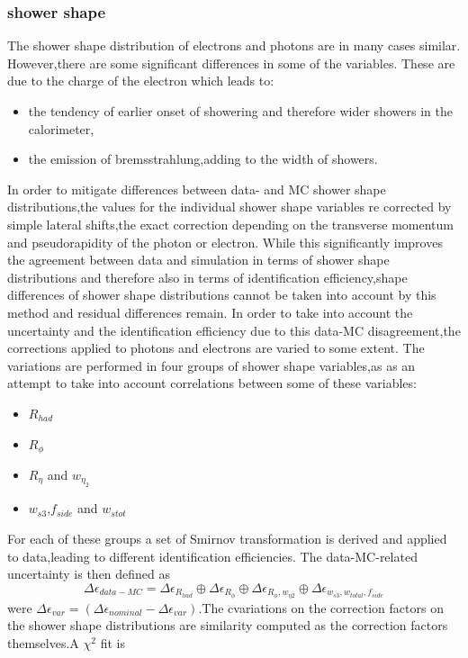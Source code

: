 \documentclass{ctexart}
\begin{document}
\subsubsection{shower shape}
The shower shape distribution of electrons and photons are in many cases similar. However,there are some significant differences in some of the variables. These are due to the charge of the electron which leads to:
\begin{itemize}
    \item the tendency of earlier onset of showering and therefore wider showers in the calorimeter,
    \item the emission of bremsstrahlung,adding to the width of showers.
\end{itemize}
In order to mitigate differences between data- and MC shower shape distributions,the values for the individual shower shape variables re corrected by simple lateral shifts,the exact correction depending on the transverse momentum and pseudorapidity of the photon or electron.  While this significantly improves the agreement between data and simulation in terms of shower shape distributions and therefore also in terms of identification efficiency,shape differences of shower shape distributions cannot be taken into account by this method and residual differences remain. In order to take into account the uncertainty and the identification efficiency due to this data-MC disagreement,the corrections applied to photons and electrons are varied to some extent. The variations are performed in four groups of shower shape variables,as as an attempt to take into account correlations between some of these variables:
\begin{itemize}
    \item $R_{had}$
    \item $R_\phi$
    \item $R_\eta$ and  $ w_{\eta_2}$
    \item $w_{s3}$,$f_{side}$ and $w_{s tot}$
\end{itemize}
For each of these groups a set of Smirnov transformation is derived and applied to data,leading to different identification efficiencies. The data-MC-related uncertainty is then defined as
$$\Delta\epsilon_{data-MC}=\Delta\epsilon_{R_{had}} \oplus\Delta\epsilon_{R_\phi}\oplus\Delta\epsilon_{R_\phi,w_{\eta2}}\oplus\Delta\epsilon_{w_{s 3},w_{total},f_{side}}$$
were $\Delta\epsilon_{var}=(\Delta\epsilon_{nominal}-\Delta\epsilon_{var})$.The cvariations on the correction factors on the shower shape distributions are similarity computed as the correction factors themselves.A $\chi^2$ fit is
\end{document}
